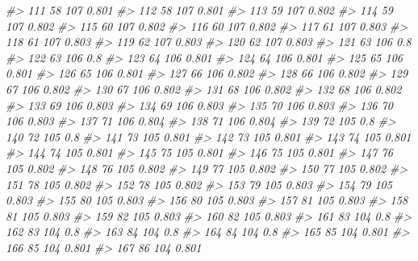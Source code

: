 \documentclass[]{book}
\newenvironment{Shaded}{\begin{snugshade}}{\end{snugshade}}
\newcommand{\CommentTok}[1]{\textcolor[rgb]{0.56,0.35,0.01}{\textit{#1}}}
\begin{document}
\begin{Shaded}
\begin{Highlighting}[]
\CommentTok{#> 111         58      107 0.801}
\CommentTok{#> 112         58      107 0.801}
\CommentTok{#> 113         59      107 0.802}
\CommentTok{#> 114         59      107 0.802}
\CommentTok{#> 115         60      107 0.802}
\CommentTok{#> 116         60      107 0.802}
\CommentTok{#> 117         61      107 0.803}
\CommentTok{#> 118         61      107 0.803}
\CommentTok{#> 119         62      107 0.803}
\CommentTok{#> 120         62      107 0.803}
\CommentTok{#> 121         63      106   0.8}
\CommentTok{#> 122         63      106   0.8}
\CommentTok{#> 123         64      106 0.801}
\CommentTok{#> 124         64      106 0.801}
\CommentTok{#> 125         65      106 0.801}
\CommentTok{#> 126         65      106 0.801}
\CommentTok{#> 127         66      106 0.802}
\CommentTok{#> 128         66      106 0.802}
\CommentTok{#> 129         67      106 0.802}
\CommentTok{#> 130         67      106 0.802}
\CommentTok{#> 131         68      106 0.802}
\CommentTok{#> 132         68      106 0.802}
\CommentTok{#> 133         69      106 0.803}
\CommentTok{#> 134         69      106 0.803}
\CommentTok{#> 135         70      106 0.803}
\CommentTok{#> 136         70      106 0.803}
\CommentTok{#> 137         71      106 0.804}
\CommentTok{#> 138         71      106 0.804}
\CommentTok{#> 139         72      105   0.8}
\CommentTok{#> 140         72      105   0.8}
\CommentTok{#> 141         73      105 0.801}
\CommentTok{#> 142         73      105 0.801}
\CommentTok{#> 143         74      105 0.801}
\CommentTok{#> 144         74      105 0.801}
\CommentTok{#> 145         75      105 0.801}
\CommentTok{#> 146         75      105 0.801}
\CommentTok{#> 147         76      105 0.802}
\CommentTok{#> 148         76      105 0.802}
\CommentTok{#> 149         77      105 0.802}
\CommentTok{#> 150         77      105 0.802}
\CommentTok{#> 151         78      105 0.802}
\CommentTok{#> 152         78      105 0.802}
\CommentTok{#> 153         79      105 0.803}
\CommentTok{#> 154         79      105 0.803}
\CommentTok{#> 155         80      105 0.803}
\CommentTok{#> 156         80      105 0.803}
\CommentTok{#> 157         81      105 0.803}
\CommentTok{#> 158         81      105 0.803}
\CommentTok{#> 159         82      105 0.803}
\CommentTok{#> 160         82      105 0.803}
\CommentTok{#> 161         83      104   0.8}
\CommentTok{#> 162         83      104   0.8}
\CommentTok{#> 163         84      104   0.8}
\CommentTok{#> 164         84      104   0.8}
\CommentTok{#> 165         85      104 0.801}
\CommentTok{#> 166         85      104 0.801}
\CommentTok{#> 167         86      104 0.801}

\end{Highlighting}
\end{Shaded}
\end{document}
